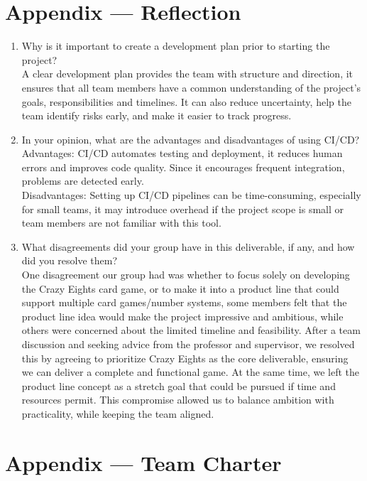 \documentclass{article}
\begin{document}
\newpage{}

\section*{Appendix --- Reflection}


\begin{enumerate}
    \item Why is it important to create a development plan prior to starting the
    project?\\ A clear development plan provides the team with structure and direction, it ensures that all team members have a common understanding of the project's goals, responsibilities and timelines. It can also reduce uncertainty, help the team identify risks early, and make it easier to track progress.
    \item In your opinion, what are the advantages and disadvantages of using
    CI/CD?\\ Advantages: CI/CD automates testing and deployment,  it reduces human errors and improves code quality.  Since it encourages frequent integration, problems are detected early. \\Disadvantages: Setting up CI/CD pipelines can be time-consuming, especially for small teams, it may introduce overhead if the project scope is small or team members are not familiar with this tool.
    \item What disagreements did your group have in this deliverable, if any,
    and how did you resolve them?\\One disagreement our group had was whether to focus solely on developing the Crazy Eights card game, or to make it into a product line that could support multiple card games/number systems,  some members felt that the product line idea would make the project impressive and ambitious, while others were concerned about the limited timeline and feasibility. After a team discussion and seeking advice from the professor and supervisor, we resolved this by agreeing to prioritize Crazy Eights as the core deliverable, ensuring we can deliver a complete and functional game. At the same time, we left the product line concept as a stretch goal that could be pursued if time and resources permit. This compromise allowed us to balance ambition with practicality, while keeping the team aligned.
\end{enumerate}

\newpage{}

\section*{Appendix --- Team Charter}
\end{document}
